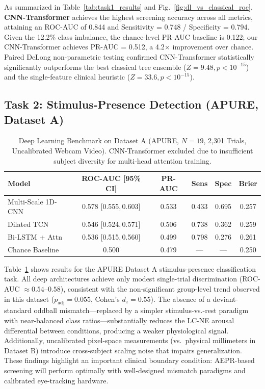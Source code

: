 \documentclass[journal]{IEEEtran}
\begin{document}
As summarized in Table~\ref{tab:task1_results} and Fig.~\ref{fig:dl_vs_classical_roc}, \textbf{CNN-Transformer} achieves the highest screening accuracy across all metrics, attaining an ROC-AUC of 0.844 and Sensitivity = 0.748 / Specificity = 0.794. Given the 12.2\% class imbalance, the chance-level PR-AUC baseline is 0.122; our CNN-Transformer achieves PR-AUC = 0.512, a 4.2$\times$ improvement over chance. Paired DeLong non-parametric testing \cite{delong1988comparing} confirmed CNN-Transformer statistically significantly outperforms the best classical tree ensemble ($Z = 9.48, p < 10^{-15}$) and the single-feature clinical heuristic ($Z = 33.6, p < 10^{-15}$).

\subsection{Task 2: Stimulus-Presence Detection (APURE, Dataset A)}

\begin{table}[t]
\centering
\small
\caption{Deep Learning Benchmark on Dataset A (APURE, $N=19$, 2,301 Trials, Uncalibrated Webcam Video). CNN-Transformer excluded due to insufficient subject diversity for multi-head attention training.}
\label{tab:task2_results}
\begin{tabular}{lccccc}
\toprule
\textbf{Model} & \textbf{ROC-AUC [95\% CI]} & \textbf{PR-AUC} & \textbf{Sens} & \textbf{Spec} & \textbf{Brier} \\
\midrule
Multi-Scale 1D-CNN & 0.578 [0.555,\,0.603] & 0.533 & 0.433 & 0.695 & 0.257 \\
Dilated TCN        & 0.546 [0.524,\,0.571] & 0.506 & 0.738 & 0.362 & 0.259 \\
Bi-LSTM + Attn     & 0.536 [0.515,\,0.560] & 0.499 & 0.798 & 0.276 & 0.261 \\
Chance Baseline    & 0.500                 & 0.479 & ---   & ---   & 0.250 \\
\bottomrule
\end{tabular}
\end{table}

Table~\ref{tab:task2_results} shows results for the APURE Dataset A stimulus-presence classification task. All deep architectures achieve only modest single-trial discrimination (ROC-AUC $\approx 0.54\text{--}0.58$), consistent with the non-significant group-level trend observed in this dataset ($p_{\text{adj}} = 0.055$, Cohen's $d_z = 0.55$). The absence of a deviant-standard oddball mismatch—replaced by a simpler stimulus-vs.-rest paradigm with near-balanced class ratios—substantially reduces the LC-NE arousal differential between conditions, producing a weaker physiological signal. Additionally, uncalibrated pixel-space measurements (vs.\ physical millimeters in Dataset B) introduce cross-subject scaling noise that impairs generalization. These findings highlight an important clinical boundary condition: AEPR-based screening will perform optimally with well-designed mismatch paradigms and calibrated eye-tracking hardware.
\end{document}
